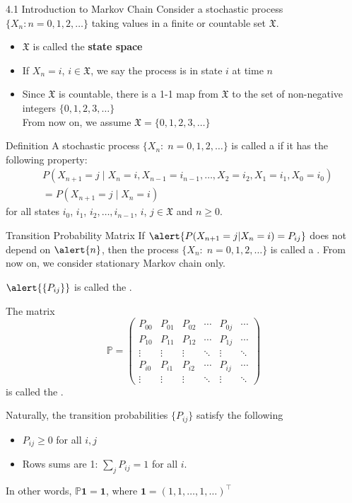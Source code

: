 \documentclass[letterpaper,mathserif,handout]{beamer}
\def\P{\mathbb{P}}
\def\Sum{\sum\nolimits}
\def\X{\mathfrak{X}}
\begin{document}
\begin{frame}{4.1 Introduction to Markov Chain}
Consider a stochastic process $\{X_n : n=0,1,2,\ldots\}$ taking values in a finite or countable set $\X$.
\begin{itemize}
\item $\X$ is called the {\bf state space}
\item If $X_n=i$, $i\in \X$, we say the process is in state $i$ at time $n$
\item Since $\X$ is countable, there is a 1-1 map from $\X$ to the set of non-negative integers $\{0,1,2,3,\ldots\}$\\
    From now on, we assume $\X=\{0,1,2,3,\ldots\}$
\end{itemize}
\begin{block}{Definition}
A stochastic process $\{X_n:\; n=0,1,2,\ldots\}$ is called a  if it has the following property:
\begin{align*}
&P(X_{n+1}=j \mid X_n=i,X_{n-1}=i_{n-1},\ldots,X_2=i_2,X_1=i_1,X_0=i_0)\\
&=P(X_{n+1}=j \mid X_n=i)
\end{align*}
for all states $i_0$, $i_1$, $i_2,\ldots, i_{n-1}$, $i$, $j\in \X$ and $n\ge 0$.\par
\end{block}
\end{frame}
\begin{frame}{Transition Probability Matrix}
If $\alert{P(X_{n+1}=j|X_n=i)=P_{ij}}$ does not depend on $\alert{n}$, then the process $\{X_n:\; n=0,1,2,\ldots\}$ is called a . From now on, we consider stationary Markov chain only.\medskip\pause

$\alert{\{P_{ij}\}}$  is called the .\pause

The matrix
$$
\P=
\begin{pmatrix}
P_{00} & P_{01} & P_{02} & \cdots &P_{0j} & \cdots\\
P_{10} & P_{11} & P_{12} & \cdots &P_{1j} & \cdots\\
\vdots & \vdots & \vdots & \ddots &\vdots & \ddots\\
P_{i0} & P_{i1} & P_{i2} & \cdots &P_{ij} & \cdots\\
\vdots & \vdots & \vdots & \ddots &\vdots & \ddots
\end{pmatrix}
$$
is called the . \pause

Naturally, the transition probabilities $\{P_{ij}\}$ satisfy the following
\begin{itemize}
\item $P_{ij}\ge 0$ for all $i,j$
\item Rows sums are 1: $\Sum_j P_{ij}=1$ for all $i$.
\end{itemize}
In other words, $\mathbb{P}\mathbf{1}=\mathbf{1}$, where $\mathbf{1}=(1,1,\ldots,1,\ldots)^\top$
\end{frame}
\end{document}
